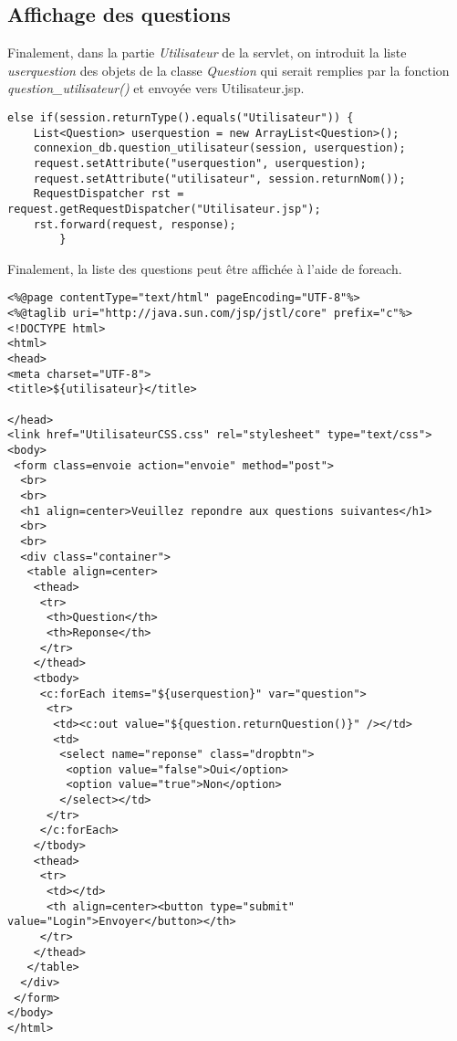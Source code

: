 \documentclass[12]{article}
\begin{document}
\subsection{Affichage des questions}

Finalement, dans la partie \emph{Utilisateur} de la servlet, on introduit la liste \textit{userquestion} des objets de la classe \textit{Question} qui serait remplies par la fonction \textit{question\_utilisateur()} et envoyée vers Utilisateur.jsp.


\begin{small}
\lstset{language=java}
\begin{lstlisting}
else if(session.returnType().equals("Utilisateur")) {
	List<Question> userquestion = new ArrayList<Question>();
	connexion_db.question_utilisateur(session, userquestion);
	request.setAttribute("userquestion", userquestion);
	request.setAttribute("utilisateur", session.returnNom());
	RequestDispatcher rst = request.getRequestDispatcher("Utilisateur.jsp");
	rst.forward(request, response);
		}
\end{lstlisting}

\end{small}


Finalement, la liste des questions peut être affichée à l'aide de foreach.\\

\begin{small}
\lstset{language=XML}
\begin{lstlisting}
<%@page contentType="text/html" pageEncoding="UTF-8"%>
<%@taglib uri="http://java.sun.com/jsp/jstl/core" prefix="c"%>
<!DOCTYPE html>
<html>
<head>
<meta charset="UTF-8">
<title>${utilisateur}</title>

</head>
<link href="UtilisateurCSS.css" rel="stylesheet" type="text/css">
<body>
 <form class=envoie action="envoie" method="post">
  <br>
  <br>
  <h1 align=center>Veuillez repondre aux questions suivantes</h1>
  <br>
  <br>
  <div class="container">
   <table align=center>
    <thead>
     <tr>
      <th>Question</th>
      <th>Reponse</th>
     </tr>
    </thead>
    <tbody>
     <c:forEach items="${userquestion}" var="question">
      <tr>
       <td><c:out value="${question.returnQuestion()}" /></td>
       <td>
        <select name="reponse" class="dropbtn">
         <option value="false">Oui</option>
         <option value="true">Non</option>
        </select></td>
      </tr>
     </c:forEach>
    </tbody>
    <thead>
     <tr>
      <td></td>
      <th align=center><button type="submit" value="Login">Envoyer</button></th>
     </tr>
    </thead>
   </table>
  </div>
 </form>
</body>
</html>
\end{lstlisting}

\end{small}
\end{document}
